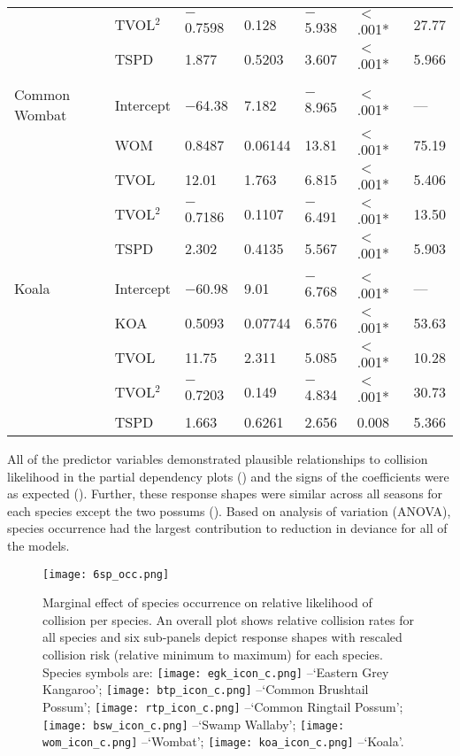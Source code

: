 \begin{table}[!t]
\begin{tabularx}{0.9\textwidth}{lllllll}
   & TVOL$^2$ & $-$0.7598 & 0.128 & $-$5.938 & $<$.001* & 27.77 \\ 
   & TSPD & 1.877 & 0.5203 & 3.607 & $<$.001* & 5.966 \\ 
   &  &  &  &  &  &  \\ 
Common Wombat & Intercept & $-$64.38 & 7.182 & $-$8.965 & $<$.001* & --- \\ 
   & WOM & 0.8487 & 0.06144 & 13.81 & $<$.001* & 75.19 \\ 
   & TVOL & 12.01 & 1.763 & 6.815 & $<$.001* & 5.406 \\ 
   & TVOL$^2$ & $-$0.7186 & 0.1107 & $-$6.491 & $<$.001* & 13.50 \\ 
   & TSPD & 2.302 & 0.4135 & 5.567 & $<$.001* & 5.903 \\ 
   &  &  &  &  &  &  \\ 
Koala & Intercept & $-$60.98 & 9.01 & $-$6.768 & $<$.001* & --- \\ 
   & KOA & 0.5093 & 0.07744 & 6.576 & $<$.001* & 53.63 \\ 
   & TVOL & 11.75 & 2.311 & 5.085 & $<$.001* & 10.28 \\ 
   & TVOL$^2$ & $-$0.7203 & 0.149 & $-$4.834 & $<$.001* & 30.73 \\ 
   & TSPD & 1.663 & 0.6261 & 2.656 & 0.008 & 5.366 \\  
\bottomrule
\end{tabularx}
\label{6sp_sum_coll}
\end{table}

All of the predictor variables demonstrated plausible relationships to collision likelihood in the partial dependency plots () and the signs of the coefficients were as expected (). Further, these response shapes were similar across all seasons for each species except the two possums (). Based on analysis of variation (ANOVA), species occurrence had the largest contribution to reduction in deviance for all of the models.

\begin{figure*}[!t]
  \centering
  \texttt{[image: 6sp\_occ.png]}
  \caption[Marginal effect of species occurrence on relative likelihood of collision for six mammal species]{Marginal effect of species occurrence on relative likelihood of collision per species. An overall plot shows relative collision rates for all species and six sub-panels depict response shapes with rescaled collision risk (relative minimum to maximum) for each species. Species symbols are: \texttt{[image: egk\_icon\_c.png]} --`Eastern Grey Kangaroo'; \texttt{[image: btp\_icon\_c.png]} --`Common Brushtail Possum'; \texttt{[image: rtp\_icon\_c.png]} --`Common Ringtail Possum'; \texttt{[image: bsw\_icon\_c.png]} --`Swamp Wallaby'; \texttt{[image: wom\_icon\_c.png]} --`Wombat'; \texttt{[image: koa\_icon\_c.png]} --`Koala'.}
  \label{6sp_effects_occ}
\end{figure*}

